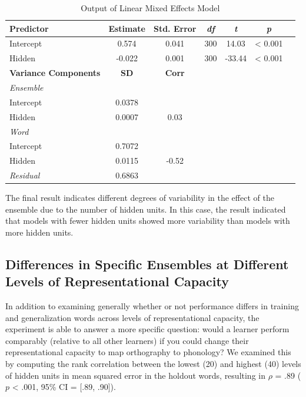 \documentclass[
  ,man,floatsintext]{apa6}
\begin{document}
\begin{table}[ht]
\centering
\caption{Output of Linear Mixed Effects Model}
\begin{tabular}{lcccccc}
\toprule
\textbf{Predictor} & \textbf{Estimate} & \textbf{Std. Error} & \textit{df} & \textit{t} & \textit{p} \\
\midrule
Intercept & 0.574 & 0.041 & 300 & 14.03 & < 0.001 \\
Hidden & -0.022 & 0.001 & 300 & -33.44 & < 0.001 \\
\midrule
\textbf{Variance Components} & \textbf{SD} & \textbf{Corr} & & & \\
\midrule
\multicolumn{6}{l}{\textit{Ensemble}} \\
\hspace{1em}Intercept & 0.0378 & & & & \\
\hspace{1em}Hidden & 0.0007 & 0.03 & & & \\
\midrule
\multicolumn{6}{l}{\textit{Word}} \\
\hspace{1em}Intercept & 0.7072 & & & & \\
\hspace{1em}Hidden & 0.0115 & -0.52 & & & \\
\textit{Residual} & 0.6863 & & & & \\
\bottomrule
\end{tabular}
\end{table}

The final result indicates different degrees of variability in the effect of the ensemble due to the number of hidden units. In this case, the result indicated that models with fewer hidden units showed more variability than models with more hidden units.

\hypertarget{differences-in-specific-ensembles-at-different-levels-of-representational-capacity}{%
\subsection{Differences in Specific Ensembles at Different Levels of Representational Capacity}\label{differences-in-specific-ensembles-at-different-levels-of-representational-capacity}}

In addition to examining generally whether or not performance differs in training and generalization words across levels of representational capacity, the experiment is able to answer a more specific question: would a learner perform comparably (relative to all other learners) if you could change their representational capacity to map orthography to phonology? We examined this by computing the rank correlation between the lowest (20) and highest (40) levels of hidden units in mean squared error in the holdout words, resulting in \(\rho\) = .89 (\(p\) \textless{} .001, 95\% CI = {[}.89, .90{]}).
\end{document}

